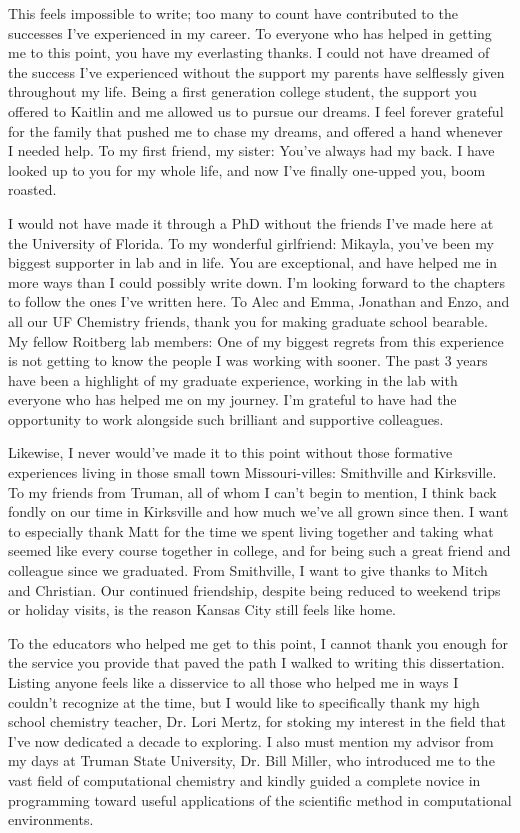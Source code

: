 This feels impossible to write; too many to count have contributed to the successes I've experienced in my career. 
To everyone who has helped in getting me to this point, you have my everlasting thanks. 
I could not have dreamed of the success I've experienced without the support my parents have selflessly given throughout my life. 
Being a first generation college student, the support you offered to Kaitlin and me allowed us to pursue our dreams. 
I feel forever grateful for the family that pushed me to chase my dreams, and offered a hand whenever I needed help.
To my first friend, my sister: You've always had my back. I have looked up to you for my whole life, and now I've finally one-upped you, boom roasted.

I would not have made it through a PhD without the friends I've made here at the University of Florida. 
To my wonderful girlfriend: Mikayla, you've been my biggest supporter in lab and in life. 
You are exceptional, and have helped me in more ways than I could possibly write down. 
I'm looking forward to the chapters to follow the ones I've written here. 
To Alec and Emma, Jonathan and Enzo, and all our UF Chemistry friends, thank you for making graduate school bearable.
My fellow Roitberg lab members: One of my biggest regrets from this experience is not getting to know the people I was working with sooner. 
The past 3 years have been a highlight of my graduate experience, working in the lab with everyone who has helped me on my journey.
I'm grateful to have had the opportunity to work alongside such brilliant and supportive colleagues.

Likewise, I never would've made it to this point without those formative experiences living in those small town Missouri-villes: Smithville and Kirksville. 
To my friends from Truman, all of whom I can't begin to mention, I think back fondly on our time in Kirksville and how much we've all grown since then. 
I want to especially thank Matt for the time we spent living together and taking what seemed like every course together in college, and for being such a great friend and colleague since we graduated.
From Smithville, I want to give thanks to Mitch and Christian.
Our continued friendship, despite being reduced to weekend trips or holiday visits, is the reason Kansas City still feels like home.

To the educators who helped me get to this point, I cannot thank you enough for the service you provide that paved the path I walked to writing this dissertation. 
Listing anyone feels like a disservice to all those who helped me in ways I couldn't recognize at the time, but I would like to specifically thank my high school chemistry teacher, Dr. Lori Mertz, for stoking my interest in the field that I've now dedicated a decade to exploring. 
I also must mention my advisor from my days at Truman State University, Dr. Bill Miller, who introduced me to the vast field of computational chemistry and kindly guided a complete novice in programming toward useful applications of the scientific method in computational environments.

